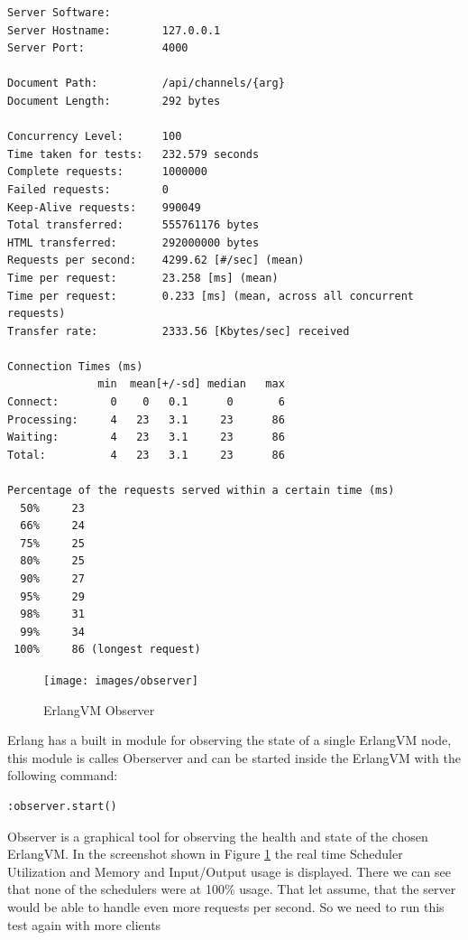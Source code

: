 \begin{lstlisting}
Server Software:        
Server Hostname:        127.0.0.1
Server Port:            4000

Document Path:          /api/channels/{arg}
Document Length:        292 bytes

Concurrency Level:      100
Time taken for tests:   232.579 seconds
Complete requests:      1000000
Failed requests:        0
Keep-Alive requests:    990049
Total transferred:      555761176 bytes
HTML transferred:       292000000 bytes
Requests per second:    4299.62 [#/sec] (mean)
Time per request:       23.258 [ms] (mean)
Time per request:       0.233 [ms] (mean, across all concurrent requests)
Transfer rate:          2333.56 [Kbytes/sec] received

Connection Times (ms)
              min  mean[+/-sd] median   max
Connect:        0    0   0.1      0       6
Processing:     4   23   3.1     23      86
Waiting:        4   23   3.1     23      86
Total:          4   23   3.1     23      86

Percentage of the requests served within a certain time (ms)
  50%     23
  66%     24
  75%     25
  80%     25
  90%     27
  95%     29
  98%     31
  99%     34
 100%     86 (longest request)
\end{lstlisting}


\begin{figure}[H]
  \caption{ErlangVM Observer}
  \label{observer}
    \texttt{[image: images/observer]}
\end{figure}

{\color{newcode}
Erlang has a built in module for observing the state of a single ErlangVM node, this module is calles Oberserver and can be started inside the ErlangVM with the following command:
\begin{lstlisting}
:observer.start()
\end{lstlisting}
 Observer is a graphical tool for observing the health and state of the chosen ErlangVM. In the screenshot shown in Figure \ref{observer} the real time Scheduler Utilization and Memory and Input/Output usage is displayed. There we can see that none of the schedulers were at 100\% usage. That let assume, that the server would be able to handle even more requests per second. So we need to run this test again with more clients}
 
